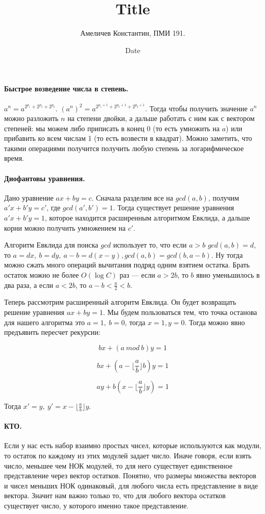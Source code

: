\documentclass[12pt]{article}
\title{Title}
\author{Амеличев Константин, ПМИ 191.}
\date{Date}
\begin{document}
\paragraph{Быстрое возведение числа в степень.} $a^n = a^{2^{p_1} + 2^{p_2} + 2^{p_k}}$. $(a^n)^2 = a^{2^{p_1 + 1} + 2^{p_2 + 1} + 2^{p_k + 1}}$. Тогда чтобы получить значение $a^n$ можно разложить $n$ на степени двойки, а дальше работать с ним как с вектором степеней: мы можем либо приписать в конец 0 (то есть умножить на $a$) или прибавить ко всем числам 1 (то есть возвести в квадрат). Можно заметить, что такими операциями получится получить любую степень за логарифмическое время.


\paragraph{Диофантовы уравнения.} Дано уравнение $ax + by = c$. Сначала разделим все на $gcd(a, b)$, получим $a'x + b'y = c'$, где $gcd(a', b') = 1$. Тогда существует решение уравнения $a'x + b'y = 1$, которое находится расширенным алгоритмом Евклида, а дальше корни можно получить умножением на $c'$.

Алгоритм Евклида для поиска $gcd$ использует то, что если $a > b$ $gcd(a, b) = d$, то $a = dx,\ b = dy,\ a - b = d(x - y), gcd(a, b) = gcd(b, a - b)$. Ну тогда можно сжать много операций вычитания подряд одним взятием остатка. Брать остаток можно не более $O(\log C)$ раз --- если $a > 2b$, то $b$ явно уменьшилось в два раза, а если $a < 2b$, то $a - b < \frac{a}{2} < b$.

Теперь рассмотрим расширенный алгоритм Евклида. Он будет возвращать решение уравнения $ax + by = 1$. Мы будем пользоваться тем, что точка останова для нашего алгоритма это $a = 1,\ b = 0$, тогда $x = 1, y = 0$. Тогда можно явно предъявить пересчет рекурсии:

$$bx + (a\ mod\ b)y = 1$$

$$bx + (a - \lfloor \frac{a}{b} \rfloor b)y = 1$$

$$ay + b (x - \lfloor \frac{a}{b} \rfloor y) =1$$

Тогда $x' = y,\ y' = x - \lfloor \frac{a}{b} \rfloor y$.

\paragraph{КТО.} Если у нас есть набор взаимно простых чисел, которые используются как модули, то остаток по каждому из этих модулей задает число. Иначе говоря, если взять число, меньшее чем НОК модулей, то для него существует единственное представление через вектор остатков. Понятно, что размеры множества векторов и чисел меньших НОК одинаковый, для любого числа есть представление в виде вектора. Значит нам важно только то, что для любого вектора остатков существует число, у которого именно такое представление. 
\end{document}
